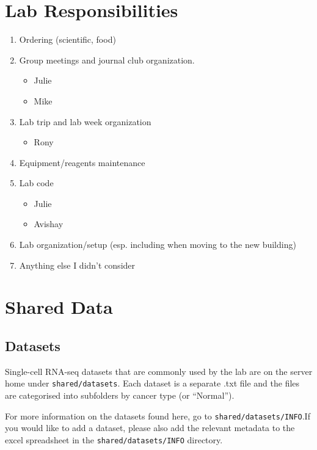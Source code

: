 \documentclass[]{book}
\providecommand{\tightlist}{%
  \setlength{\itemsep}{0pt}\setlength{\parskip}{0pt}}
\begin{document}
\chapter{Lab Responsibilities}\label{labResponsibilities}

\begin{enumerate}
\def\labelenumi{\arabic{enumi}.}
\item
  Ordering (scientific, food)
\item
  Group meetings and journal club organization.

  \begin{itemize}
  \tightlist
  \item
    Julie
  \item
    Mike
  \end{itemize}
\item
  Lab trip and lab week organization

  \begin{itemize}
  \tightlist
  \item
    Rony
  \end{itemize}
\item
  Equipment/reagents maintenance
\item
  Lab code

  \begin{itemize}
  \tightlist
  \item
    Julie
  \item
    Avishay
  \end{itemize}
\item
  Lab organization/setup (esp. including when moving to the new
  building)
\item
  Anything else I didn't consider
\end{enumerate}

\chapter{Shared Data}\label{sharedData}

\section{Datasets}\label{datasets}

Single-cell RNA-seq datasets that are commonly used by the lab are on
the server home under \texttt{shared/datasets}. Each dataset is a
separate .txt file and the files are categorised into subfolders by
cancer type (or ``Normal'').

For more information on the datasets found here, go to
\texttt{shared/datasets/INFO}.If you would like to add a dataset, please
also add the relevant metadata to the excel spreadsheet in the
\texttt{shared/datasets/INFO} directory.
\end{document}
